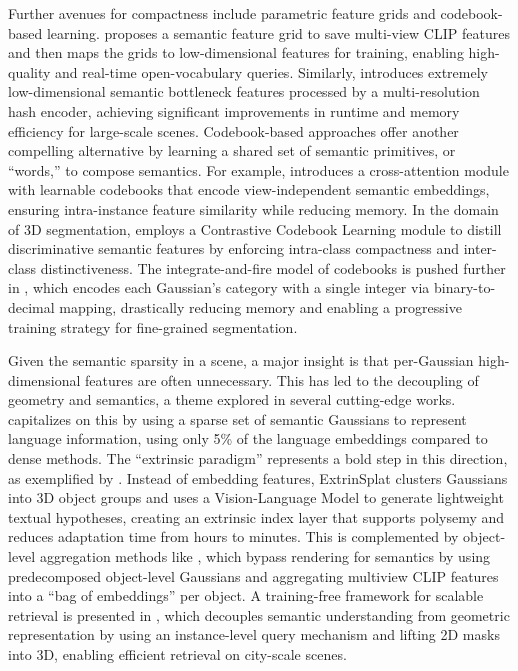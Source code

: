 \documentclass[11pt]{article}
\begin{document}
Further avenues for compactness include parametric feature grids and codebook-based learning. \cite{ref499} proposes a semantic feature grid to save multi-view CLIP features and then maps the grids to low-dimensional features for training, enabling high-quality and real-time open-vocabulary queries. Similarly, \cite{ref500} introduces extremely low-dimensional semantic bottleneck features processed by a multi-resolution hash encoder, achieving significant improvements in runtime and memory efficiency for large-scale scenes. Codebook-based approaches offer another compelling alternative by learning a shared set of semantic primitives, or ``words,'' to compose semantics. For example, \cite{ref501} introduces a cross-attention module with learnable codebooks that encode view-independent semantic embeddings, ensuring intra-instance feature similarity while reducing memory. In the domain of 3D segmentation, \cite{ref502} employs a Contrastive Codebook Learning module to distill discriminative semantic features by enforcing intra-class compactness and inter-class distinctiveness. The integrate-and-fire model of codebooks is pushed further in \cite{ref503}, which encodes each Gaussian's category with a single integer via binary-to-decimal mapping, drastically reducing memory and enabling a progressive training strategy for fine-grained segmentation.

Given the semantic sparsity in a scene, a major insight is that per-Gaussian high-dimensional features are often unnecessary. This has led to the decoupling of geometry and semantics, a theme explored in several cutting-edge works. \cite{ref504} capitalizes on this by using a sparse set of semantic Gaussians to represent language information, using only 5\% of the language embeddings compared to dense methods. The ``extrinsic paradigm'' represents a bold step in this direction, as exemplified by \cite{ref505}. Instead of embedding features, ExtrinSplat clusters Gaussians into 3D object groups and uses a Vision-Language Model to generate lightweight textual hypotheses, creating an extrinsic index layer that supports polysemy and reduces adaptation time from hours to minutes. This is complemented by object-level aggregation methods like \cite{ref506}, which bypass rendering for semantics by using predecomposed object-level Gaussians and aggregating multiview CLIP features into a ``bag of embeddings'' per object. A training-free framework for scalable retrieval is presented in \cite{ref507}, which decouples semantic understanding from geometric representation by using an instance-level query mechanism and lifting 2D masks into 3D, enabling efficient retrieval on city-scale scenes.
\end{document}

